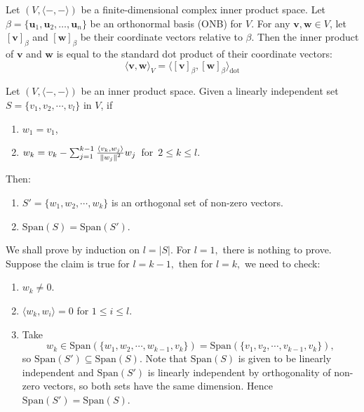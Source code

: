 \begin{theorem}
    Let $(V,\langle-,-\rangle)$ be a finite-dimensional complex inner product space. Let $\beta = \{\mathbf{u}_1, \mathbf{u}_2, \dots, \mathbf{u}_n\}$ be an orthonormal basis (ONB) for $V$. For any $\mathbf{v}, \mathbf{w} \in V$, let $[\mathbf{v}]_\beta$ and $[\mathbf{w}]_\beta$ be their coordinate vectors relative to $\beta$. Then the inner product of $\mathbf{v}$ and $\mathbf{w}$ is equal to the standard dot product of their coordinate vectors:
    $$ \langle \mathbf{v}, \mathbf{w} \rangle_V = \langle [\mathbf{v}]_\beta, [\mathbf{w}]_\beta \rangle_{\mathrm{dot}} $$
    \label{coordinate dot product}
\end{theorem}

\begin{theorem}
    Let $(V,\langle-,-\rangle)$ be an inner product space. Given a linearly independent set $S=\{v_1,v_2,\cdots,v_l\}$ in $V$, if
    \begin{enumerate}
        \item $w_1=v_1$,
        \item $w_k=v_k-\sum_{j=1}^{k-1}\frac{\langle v_k, w_j\rangle}{\left\lVert w_j \right\rVert^2}w_j\,$ for $\,2\le k\le l.$
    \end{enumerate} 
    Then:
    \begin{enumerate}
        \item $S'=\{w_1,w_2,\cdots,w_k\}$ is an orthogonal set of non-zero vectors.
        \item $\mathrm{Span}(S)=\mathrm{Span}(S').$
    \end{enumerate}
\end{theorem}

\begin{pfbox}
    We shall prove by induction on $l=|S|.$
    For $l=1,$ there is nothing to prove. Suppose the claim is true for $l=k-1,$ then for $l=k,$
    we need to check:
    \begin{enumerate}
        \item $w_k\neq 0.$
        \item $\langle w_k, w_i\rangle=0$ for $1\le i\le l$.
        \item Take 
        $$w_k\in\mathrm{Span}(\{w_1,w_2,\cdots,w_{k-1},v_{k}\})=\mathrm{Span}(\{v_1,v_2,\cdots,v_{k-1},v_{k}\}),$$ 
        so $\mathrm{Span}(S')\subseteq\mathrm{Span}(S).$
        Note that $\mathrm{Span}(S)$ is given to be linearly independent and $\mathrm{Span}(S')$ is linearly independent by orthogonality of non-zero vectors, so both sets have the same dimension. Hence $\mathrm{Span}(S')=\mathrm{Span}(S).$
    \end{enumerate}
\end{pfbox}

